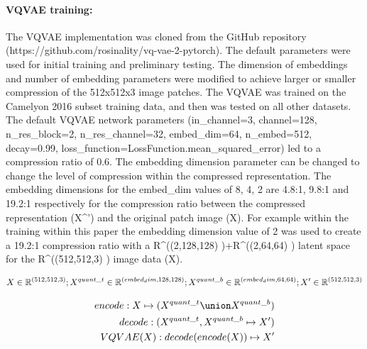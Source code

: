 \documentclass[review]{elsarticle}
\begin{document}
\paragraph{VQVAE training:} The VQVAE implementation was cloned from the GitHub repository (https://github.com/rosinality/vq-vae-2-pytorch). The default parameters were used for initial training and preliminary testing. The dimension of embeddings and number of embedding parameters were modified to achieve larger or smaller compression of the 512x512x3 image patches. The VQVAE was trained on the Camelyon 2016 subset training data, and then was tested on all other datasets. \\
The default VQVAE network parameters (in_channel=3, channel=128, n_res_block=2, n_res_channel=32, embed_dim=64, n_embed=512, decay=0.99, loss_function=LossFunction.mean_squared_error) led to a compression ratio of 0.6. The embedding dimension parameter can be changed to change the level of compression within the compressed representation. The embedding dimensions for the embed_dim values of 8, 4, 2 are 4.8:1, 9.8:1 and 19.2:1 respectively for the compression ratio between the compressed representation (X^') and the original patch image (X). For example within the training within this paper the embedding dimension value of 2 was used to create a 19.2:1 compression ratio with a R^((2,128,128) )+R^((2,64,64) ) latent space for the R^((512,512,3) ) image data (X).

\begin{equation}
    X\in\mathbb{R}^{(512, 512, 3)};\\ X^{quant\_t}\in\mathbb{R}^{(embed_dim, 128, 128)}; X^{quant\_b}\in\mathbb{R}^{(embed_dim, 64, 64)}; X'\in\mathbb{R}^{(512, 512, 3)}
\end{equation}
    
\begin{align*}
    encode: X\mapsto (X^{quant\_t}\union X^{quant\_b}) \\
    decode: (X^{quant\_t}, X^{quant\_b}\mapsto X') \\
    VQVAE(X): decode(encode(X))\mapsto X'
    \label{eq:VQVAEarchitecture}
\end{align*}

    
\end{document}
